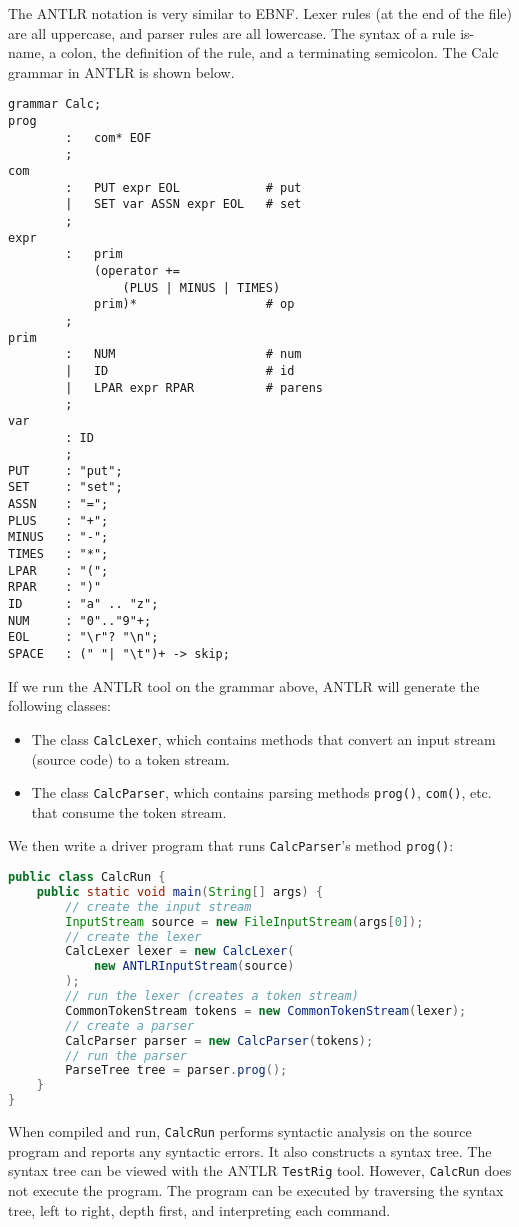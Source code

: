 \documentclass[a4paper, openany]{memoir}
\begin{document}
The ANTLR notation is very similar to EBNF. Lexer rules (at the end of the file) are all uppercase, and parser rules are all lowercase. The syntax of a rule is- name, a colon, the definition of the rule, and a terminating semicolon. The Calc grammar in ANTLR is shown below.
\begin{lstlisting}
grammar Calc;
prog
        :   com* EOF
        ;
com
        :   PUT expr EOL            # put
        |   SET var ASSN expr EOL   # set
        ;
expr
        :   prim
            (operator += 
                (PLUS | MINUS | TIMES)
            prim)*                  # op
        ;
prim
        :   NUM                     # num
        |   ID                      # id
        |   LPAR expr RPAR          # parens
        ;
var
        : ID
        ;
PUT     : "put";
SET     : "set";
ASSN    : "=";
PLUS    : "+";
MINUS   : "-";
TIMES   : "*";
LPAR    : "(";
RPAR    : ")"
ID      : "a" .. "z";
NUM     : "0".."9"+;
EOL     : "\r"? "\n";
SPACE   : (" "| "\t")+ -> skip;
\end{lstlisting}
If we run the ANTLR tool on the grammar above, ANTLR will generate the following classes:
\begin{itemize}
    \item The class \texttt{CalcLexer}, which contains methods that convert an input stream (source code) to a token stream.
    \item The class \texttt{CalcParser}, which contains parsing methods \texttt{prog()}, \texttt{com()}, etc. that consume the token stream.
\end{itemize}
We then write a driver program that runs \texttt{CalcParser}'s method \texttt{prog()}:
\begin{lstlisting}[language=java]
public class CalcRun {
    public static void main(String[] args) {
        // create the input stream
        InputStream source = new FileInputStream(args[0]);
        // create the lexer
        CalcLexer lexer = new CalcLexer(
            new ANTLRInputStream(source)
        );
        // run the lexer (creates a token stream)
        CommonTokenStream tokens = new CommonTokenStream(lexer);
        // create a parser
        CalcParser parser = new CalcParser(tokens);
        // run the parser
        ParseTree tree = parser.prog();
    }
}
\end{lstlisting}

When compiled and run, \texttt{CalcRun} performs syntactic analysis on the source program and reports any syntactic errors. It also constructs a syntax tree. The syntax tree can be viewed with the ANTLR \texttt{TestRig} tool. However, \texttt{CalcRun} does not execute the program. The program can be executed by traversing the syntax tree, left to right, depth first, and interpreting each command.
\end{document}

